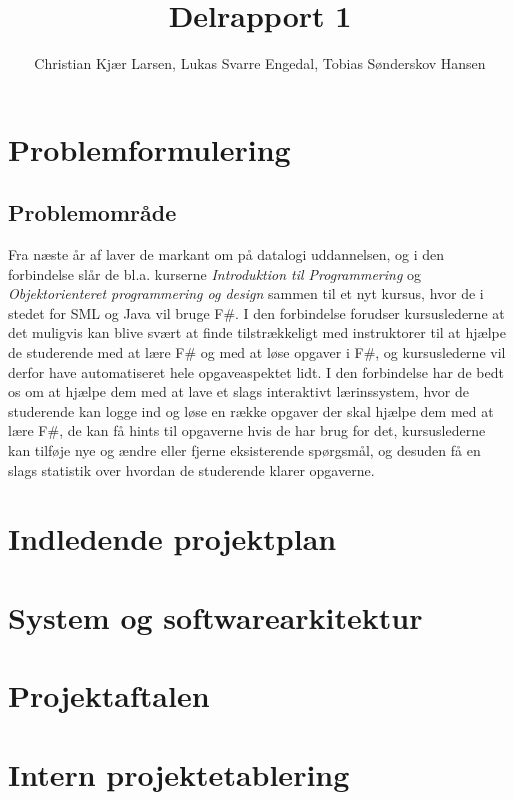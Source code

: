 \documentclass[12pt]{article}
\title{Delrapport 1}
\author{Christian Kjær Larsen, Lukas Svarre Engedal, Tobias Sønderskov Hansen}
\begin{document}
\maketitle

\section{Problemformulering}
\subsection{Problemområde}
Fra næste år af laver de markant om på datalogi uddannelsen, og i den forbindelse slår de bl.a. kurserne \emph{Introduktion til Programmering} og \emph{Objektorienteret programmering og design} sammen til et nyt kursus, hvor de i stedet for SML og Java vil bruge F\#. I den forbindelse forudser kursuslederne at det muligvis kan blive svært at finde tilstrækkeligt med instruktorer til at hjælpe de studerende med at lære F\# og med at løse opgaver i F\#, og kursuslederne vil derfor have automatiseret hele opgaveaspektet lidt. 
I den forbindelse har de bedt os om at hjælpe dem med at lave et slags interaktivt lærinssystem, hvor de studerende kan logge ind og løse en række opgaver der skal hjælpe dem med at lære F\#, de kan få hints til opgaverne hvis de har brug for det, kursuslederne kan tilføje nye og  ændre eller fjerne eksisterende spørgsmål, og desuden få en slags statistik over hvordan de studerende klarer opgaverne.
\section{Indledende projektplan}
\section{System og softwarearkitektur}
\section{Projektaftalen}
\section{Intern projektetablering}
\end{document}
